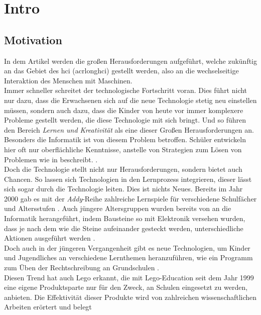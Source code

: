 \chapter{Intro}


\section{Motivation}

In dem Artikel  werden die großen Herausforderungen aufgeführt, welche zukünftig an das Gebiet des \acrshort{hci} (acrlong{hci}) gestellt werden, also an die wechselseitige Interaktion des Menschen mit Maschinen.\\  Immer schneller schreitet der technologische Fortschritt voran. Dies führt nicht nur dazu, dass die Erwachsenen sich auf die neue Technologie stetig neu einstellen müssen, sondern auch dazu, dass die Kinder von heute vor immer komplexere Probleme gestellt werden, die diese Technologie mit sich bringt. Und so führen \citeauthor{stephanidis_seven_2019} den Bereich \textit{Lernen und Kreativität} als eine dieser Großen Herausforderungen an. Besonders die Informatik ist von diesem Problem betroffen. Schüler entwickeln hier oft nur oberflächliche Kenntnisse, anstelle von Strategien zum Lösen von Problemen wie \citeauthor{kazimoglu_serious_2012} in  beschreibt. \cite{kazimoglu_serious_2012}.\\
Doch die Technologie stellt nicht nur Herausforderungen, sondern bietet auch Chancen. So lassen sich Technologien in den Lernprozess integrieren, dieser lässt sich sogar durch die Technologie leiten. Dies ist nichts Neues. Bereits im Jahr 2000 gab es mit der \textit{Addy}-Reihe zahlreiche Lernspiele für verschiedene Schulfächer und Altersstufen \cite{addy}. Auch jüngere Altersgruppen wurden bereits \citeyear{wyeth_tangible_2002} von \citeauthor{wyeth_tangible_2002} an die Informatik herangeführt, indem Bausteine so mit Elektronik versehen wurden, dass je nach dem wie die Steine aufeinander gesteckt werden, unterschiedliche Aktionen ausgeführt werden \cite{wyeth_tangible_2002}. \\
Doch auch in der jüngeren Vergangenheit gibt es neue Technologien, um Kinder und Jugendliches an verschiedene Lernthemen heranzuführen, wie ein Programm zum Üben der Rechtschreibung an Grundschulen \cite{berkling_learning_2020}.\\
Diesen Trend hat auch \gls{Lego} erkannt, die mit \gls{Lego}-Education seit dem Jahr 1999 eine eigene Produktsparte nur für den Zweck, an Schulen eingesetzt zu werden, anbieten. Die Effektivität dieser Produkte wird von zahlreichen wissenschaftlichen Arbeiten erörtert und belegt \cite{perez_new_2015, karatrantou_algorithm_2008, jun_design_2016, cuellar_design_2014, klassner_lego_2003}\\
